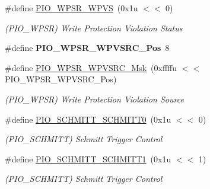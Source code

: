 \begin{DoxyCompactItemize}
\#define \mbox{\hyperlink{group__SAMS70__PIO_gab2743f8c6f0577c266f990cdd41b1c47}{P\+I\+O\+\_\+\+W\+P\+S\+R\+\_\+\+W\+P\+VS}}~(0x1u $<$$<$ 0)
\begin{DoxyCompactList}\small\item\em (P\+I\+O\+\_\+\+W\+P\+SR) Write Protection Violation Status \end{DoxyCompactList}\item 
\mbox{\label{group__SAMS70__PIO_gafb016684495c4d9ca79588b692dcce8a}} 
\#define {\bfseries P\+I\+O\+\_\+\+W\+P\+S\+R\+\_\+\+W\+P\+V\+S\+R\+C\+\_\+\+Pos}~8
\item 
\mbox{\label{group__SAMS70__PIO_gacc9b2ff45ba388215533d56205d5357a}} 
\#define \mbox{\hyperlink{group__SAMS70__PIO_gacc9b2ff45ba388215533d56205d5357a}{P\+I\+O\+\_\+\+W\+P\+S\+R\+\_\+\+W\+P\+V\+S\+R\+C\+\_\+\+Msk}}~(0xffffu $<$$<$ P\+I\+O\+\_\+\+W\+P\+S\+R\+\_\+\+W\+P\+V\+S\+R\+C\+\_\+\+Pos)
\begin{DoxyCompactList}\small\item\em (P\+I\+O\+\_\+\+W\+P\+SR) Write Protection Violation Source \end{DoxyCompactList}\item 
\mbox{\label{group__SAMS70__PIO_gaab5c0e749fba5a69a23b982d0df495a8}} 
\#define \mbox{\hyperlink{group__SAMS70__PIO_gaab5c0e749fba5a69a23b982d0df495a8}{P\+I\+O\+\_\+\+S\+C\+H\+M\+I\+T\+T\+\_\+\+S\+C\+H\+M\+I\+T\+T0}}~(0x1u $<$$<$ 0)
\begin{DoxyCompactList}\small\item\em (P\+I\+O\+\_\+\+S\+C\+H\+M\+I\+TT) Schmitt Trigger Control \end{DoxyCompactList}\item 
\mbox{\label{group__SAMS70__PIO_ga801925c1df838dbcd14c6bd6cc2858c3}} 
\#define \mbox{\hyperlink{group__SAMS70__PIO_ga801925c1df838dbcd14c6bd6cc2858c3}{P\+I\+O\+\_\+\+S\+C\+H\+M\+I\+T\+T\+\_\+\+S\+C\+H\+M\+I\+T\+T1}}~(0x1u $<$$<$ 1)
\begin{DoxyCompactList}\small\item\em (P\+I\+O\+\_\+\+S\+C\+H\+M\+I\+TT) Schmitt Trigger Control \end{DoxyCompactList}\item 
\mbox{\label{group__SAMS70__PIO_gad694f48d35253a97f0130c266a3ef205}} 

\end{DoxyCompactItemize}
